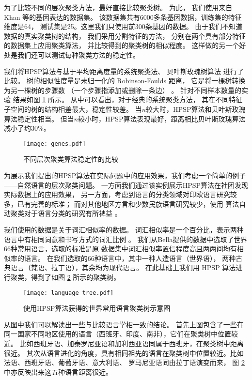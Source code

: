 为了比较不同的层次聚类方法，最好直接比较聚类树。
为此，
我们使用来自 Khan 等\cite{khan2001classification}的基因表达的数据集。
该数据集共有6000多条基因数据，训练集的特征维度是64，
测试集是25。这里我们只使用前300条基因的数据。
由于我们不知道数据的真实聚类树的结构，
我们采用分割特征的方法，
分别在两个具有部分特征的数据集上应用聚类算法，
并比较得到的聚类树的相似程度。
这样做的另一个好处是我们还可以测试每种聚类方法的稳定性。

我们将HPSP算法与基于平均距离度量的系统聚类法、
贝叶斯玫瑰树算法
\cite{blundell2011discovering}
进行了比较。
树的相似性度量是未归一化的 Robinson-Foulds 距离，
它是将一棵树转换为另一棵树的步骤数
（一个步骤指添加或删除一条边）
\citep{day1985optimal}。
针对不同样本数量的实验
结果如图 \ref{fig:shc} 所示。
从中可以看出，对于经典的系统聚类方法，
其在不同特征子空间的树的结构相差最大，稳定性较差。
当$n$较大时，HPSP算法和贝叶斯玫瑰算法稳定性相当。
但当$n$较小时，HPSP算法表现最好，距离相比贝叶斯玫瑰算法减小了约30\%。

\begin{figure}[!ht]
\centering
\texttt{[image: genes.pdf]}
\caption{不同层次聚类算法稳定性的比较}\label{fig:shc}
\end{figure}

为展示我们提出的HPSP算法在实际问题中的应用效果，我们考虑一个简单的例子——自然语言的层次聚类问题。
一方面我们通过该实例展示HPSP算法在社团发现实际数据上的应用效果，
另一方面，考虑到语言的分类领域对印欧语言研究较多，已有完善的标准；
而对其他地区方言和少数民族语言研究较少，使用
算法自动聚类对于语言分类的研究有所裨益 \cite{nasution2019visualizing}。

我们使用的数据是关于词汇相似率的数据。
词汇相似率是一个百分比，表示两种语言中有相同词意和书写方式的词汇比例
\cite{bella2021database}。
我们从Bella提供的数据中选取了世界66种常用语言，选取的标准是原
数据集中词汇相似率置信程度高且两两间均有相似率的语言。
在我们选取的66种语言中，其中一种人造语言（世界语），
两种古典语言（梵语、拉丁语），其余均为现代语言。
在此基础上我们用 HPSP 算法进行聚类，得到了如图 \ref{fig:language_tree} 所示的聚类树。

\begin{figure}[!ht]
    \centering
    \texttt{[image: language\_tree.pdf]}
    \caption{使用HPSP算法获得的世界常用语言聚类树示意图}\label{fig:language_tree}
\end{figure}

从图中我们可以解读出一些与比较语言学相一致的结论。
首先上图包含了一些在同一国家不同地区使用的语言（西班牙、印度、南非），它们在聚类树中位置较近。
比如西班牙语、加泰罗尼亚语和加利西亚语同属于西班牙，在聚类树中距离很近。
其次从语言进化的角度，具有相同祖先的语言在聚类树中位置较近。比如法语、西班牙语、葡萄牙语、意大利语、
罗马尼亚语同由拉丁语演变而来，
图 \ref{fig:language_tree} 中亦反映出来这五种语言距离很近。

